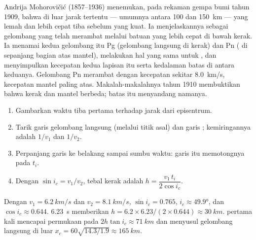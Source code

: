 \begin{history}
Andrija Mohorovičić (1857--1936) menemukan, pada rekaman gempa bumi tahun
1909, bahwa di luar jarak tertentu --- umumnya antara 100 dan
\qty{150}{km} ---  yang lemah dan lebih cepat tiba sebelum  yang kuat. Ia menjelaskannya sebagai gelombang yang telah merambat melalui
batuan yang lebih cepat di bawah kerak. Ia menamai kedua gelombang itu Pg
(gelombang langsung di kerak) dan Pn ( di sepanjang bagian atas
mantel), melakukan hal yang sama untuk , dan menyimpulkan kecepatan
kedua lapisan itu serta kedalaman batas di antara keduanya. Gelombang Pn
merambat dengan kecepatan sekitar \qty{8.0}{km/s}, kecepatan mantel paling
atas. Makalah-makalahnya tahun 1910 membuktikan bahwa kerak dan mantel
berbeda; batas itu menyandang namanya.
\end{history}

\begin{method}\label{met:g11:seismic-structure:moho}
\begin{enumerate}
  \item Gambarkan waktu tiba pertama terhadap jarak dari
        episentrum.
  \item Tarik garis gelombang langsung (melalui titik asal) dan garis
        ; kemiringannya adalah $1/v_1$ dan $1/v_2$.
  \item Perpanjang garis  ke belakang sampai sumbu waktu:
        garis itu memotongnya pada  $t_i$.
  \item Dengan $\sin i_c = v_1/v_2$, tebal kerak adalah
        $h = \dfrac{v_1\,t_i}{2\cos i_c}$.
\end{enumerate}
\end{method}

\begin{example}\label{ex:g11:seismic-structure:moho}
Dengan $v_1 = \qty{6.2}{km/s}$ dan $v_2 = \qty{8.1}{km/s}$, $\sin i_c = 0.765$,
$i_c \approx \ang{49.9}$, dan $\cos i_c \approx 0.644$. 
\qty{6.23}{s} memberikan $h = 6.2 \times 6.23/(2 \times 0.644) \approx
\qty{30}{km}$.  pertama kali mencapai permukaan pada
$2h\tan i_c \approx \qty{71}{km}$ dan menyusul gelombang langsung di luar
$x_c = 60\sqrt{14.3/1.9} \approx \qty{165}{km}$.
\end{example}

